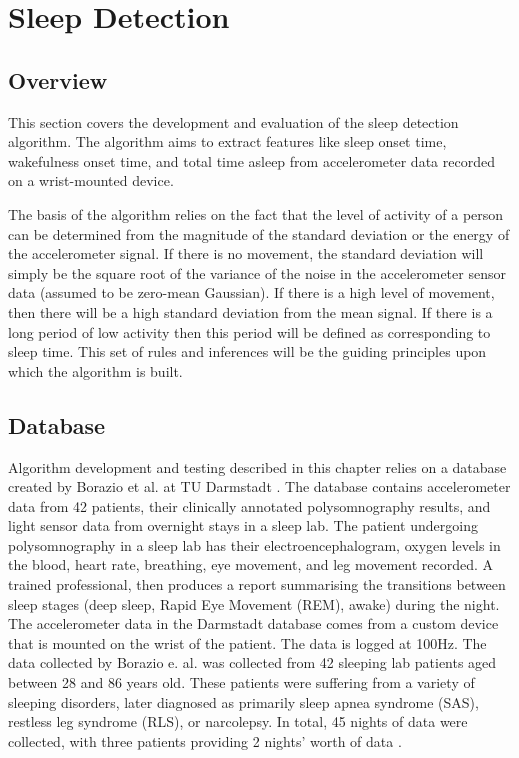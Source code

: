\part{Sleep Detection}

    \chapter{Overview}

        This section covers the development and evaluation of the sleep detection algorithm. The algorithm aims to extract features like sleep onset time, wakefulness onset time, and total time asleep from accelerometer data recorded on a wrist-mounted device.

        The basis of the algorithm relies on the fact that the level of activity of a person can be determined from the magnitude of the standard deviation or the energy of the accelerometer signal. If there is no movement, the standard deviation will simply be the square root of the variance of the noise in the accelerometer sensor data (assumed to be zero-mean Gaussian). If there is a high level of movement, then there will be a high standard deviation from the mean signal. If there is a long period of low activity then this period will be defined as corresponding to sleep time. This set of rules and inferences will be the guiding principles upon which the algorithm is built.


    \chapter{Database}
        \label{c-database}

        Algorithm development and testing described in this chapter relies on a database created by Borazio et al. at TU Darmstadt \cite{borazio}. The database contains accelerometer data from 42 patients, their clinically annotated polysomnography results, and light sensor data from overnight stays in a sleep lab. The patient undergoing polysomnography in a sleep lab has their electroencephalogram, oxygen levels in the blood, heart rate, breathing, eye movement, and leg movement recorded. A trained professional, then produces a report summarising the transitions between sleep stages (deep sleep, Rapid Eye Movement (REM), awake) during the night. The accelerometer data in the Darmstadt database comes from a custom device that is mounted on the wrist of the patient. The data is logged at 100Hz. The data collected by Borazio e. al. was collected from 42 sleeping lab patients aged between 28 and 86 years old. These patients were suffering from a variety of sleeping disorders, later diagnosed as primarily sleep apnea syndrome (SAS), restless leg syndrome (RLS), or narcolepsy. In total, 45 nights of data were collected, with three patients providing 2 nights' worth of data \cite{borazio}.


